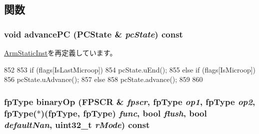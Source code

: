\subsection{関数}
\hypertarget{classArmISA_1_1FpOp_af04cd01429462d48e635f3e01ced6257}{
\subsubsection[{advancePC}]{\setlength{\rightskip}{0pt plus 5cm}void advancePC (PCState \& {\em pcState}) const}}
\label{classArmISA_1_1FpOp_af04cd01429462d48e635f3e01ced6257}


\hyperlink{classArmISA_1_1ArmStaticInst_af04cd01429462d48e635f3e01ced6257}{ArmStaticInst}を再定義しています。


\begin{DoxyCode}
852     {
853         if (flags[IsLastMicroop]) {
854             pcState.uEnd();
855         } else if (flags[IsMicroop]) {
856             pcState.uAdvance();
857         } else {
858             pcState.advance();
859         }
860     }
\end{DoxyCode}
\hypertarget{classArmISA_1_1FpOp_acd464f48fab5cc85b99d2f45897149ba}{
\subsubsection[{binaryOp}]{\setlength{\rightskip}{0pt plus 5cm}fpType binaryOp (FPSCR \& {\em fpscr}, \/  fpType {\em op1}, \/  fpType {\em op2}, \/  fpType($\ast$)(fpType, fpType) {\em func}, \/  bool {\em flush}, \/  bool {\em defaultNan}, \/  {\bf uint32\_\-t} {\em rMode}) const}}
\label{classArmISA_1_1FpOp_acd464f48fab5cc85b99d2f45897149ba}



